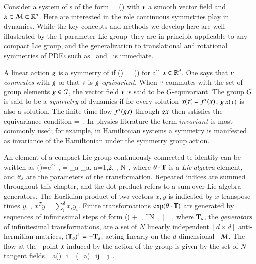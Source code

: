 \documentclass[preprint,number,sort&compress]{elsarticle}
\begin{document}
Consider a system of \ode s of the form
\beq
	\dot{\ssp} = \vf(\ssp)
	\label{eq:difeq}
\eeq
with $v$ a smooth vector field and $x\in{\cal M}\subset\mathbb{R}^{d}$.
Here are interested in the role continuous symmetries
play in dynamics.
While the key concepts and methods we develop here are well
illustrated by the 1-parameter Lie  group, they are in
principle applicable to any compact Lie group, and the
generalization to translational and rotational symmetries of
PDEs such as \KS\ and \pCf\ is immediate.

A linear action $g$ is a symmetry of
 if
\beq
	\vf(\LieEl \ssp) =\LieEl \, \vf(\ssp)
	\label{eq:equiv}
\eeq
for all $x\in\mathbb{R}^{d}$. One  says that $v$ \emph{commutes}
with $g$ or that $v$ is $g$-\emph{equivariant}.
When $v$ commutes with the set of group elements
$g\in G$, the vector field $v$ is said to be
$G$-equivariant. The group $G$ is said to be a {\em
symmetry} of dynamics if for every solution $x(\tau)=
{f^{\tau}(x)}$, $g \, x(\tau)$ is also a solution. The finite
time flow ${f^{\tau}(g x)}$ through $g x$ then
satisfies the equivariance condition
\beq\label{eq:equivFinite}
\flow{\tau}{\LieEl \ssp}=\LieEl\flow{\tau}{\ssp}
\,.
\eeq
In physics literature the term $invariant$ is most commonly
used; for example, in Hamiltonian systems a symmetry is
manifested as invariance of the Hamiltonian under the
symmetry group action.

An element of a compact Lie group
continuously connected to identity can be written as
\beq
\LieEl(\gSpace)=e^{\gSpace \cdot \Lg }
	\,,\qquad
\gSpace \cdot \Lg  = \sum \gSpace_a \Lg_a,\; a=1,2, \cdots, N
\,,
where
${\bf \theta} \cdot \mathbf{T}$
is a {\em Lie algebra} element,  and ${\bf \theta}_a$ are the parameters
of the transformation. Repeated indices are summed throughout this
chapter, and the dot product refers to a sum over
Lie algebra generators. The Euclidian product of two vectors
$x,y$ is indicated by $x$-transpose times $y$, \ie,
$x^T y = \sum_i^d x_i y_i$.
Finite transformations $ \exp({\bf \theta} \cdot {\ensuremath{\mathbf{T}}}) $ are
generated by sequences of infinitesimal steps of form
\beq
\LieEl(\delta\gSpace)  + \delta \gSpace \cdot \Lg
    \,,\quad
\delta\gSpace \in \reals^N
    \,,\quad
|\delta \gSpace| 
    \, ,
where $\mathbf{T}_a$, the {\em generators} of infinitesimal
transformations, are a set of $N$ linearly independent
$[d\!\times\!d]$ anti-hermitian matrices, $(\mathbf{T}_a)^\dagger =
- \mathbf{T}_a$, acting linearly on the $d$-dim\-ens\-ion\-al \statesp\
${\cal M}$.
The flow
at the \statesp\ point $x$ induced by the action of the group
is given by the set of $N$ tangent fields
\beq
\groupTan_a(\ssp)_{i}= (\Lg_a){}_{ij} \ssp_j
\,.
\end{document}
